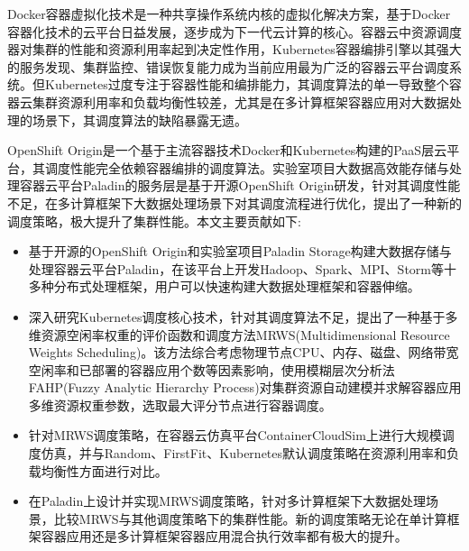 \begin{cabstract}
  Docker容器虚拟化技术是一种共享操作系统内核的虚拟化解决方案，基于Docker容器化技术的云平台日益发展，逐步成为下一代云计算的核心。容器云中资源调度器对集群的性能和资源利用率起到决定性作用，Kubernetes容器编排引擎以其强大的服务发现、集群监控、错误恢复能力成为当前应用最为广泛的容器云平台调度系统。但Kubernetes过度专注于容器性能和编排能力，其调度算法的单一导致整个容器云集群资源利用率和负载均衡性较差，尤其是在多计算框架容器应用对大数据处理的场景下，其调度算法的缺陷暴露无遗。

OpenShift Origin是一个基于主流容器技术Docker和Kubernetes构建的PaaS层云平台，其调度性能完全依赖容器编排的调度算法。实验室项目大数据高效能存储与处理容器云平台Paladin的服务层是基于开源OpenShift Origin研发，针对其调度性能不足，在多计算框架下大数据处理场景下对其调度流程进行优化，提出了一种新的调度策略，极大提升了集群性能。本文主要贡献如下:
  \begin{itemize}
  \item 基于开源的OpenShift Origin和实验室项目Paladin Storage构建大数据存储与处理容器云平台Paladin，在该平台上开发Hadoop、Spark、MPI、Storm等十多种分布式处理框架，用户可以快速构建大数据处理框架和容器伸缩。
  \item 深入研究Kubernetes调度核心技术，针对其调度算法不足，提出了一种基于多维资源空闲率权重的评价函数和调度方法MRWS(Multidimensional Resource Weights Scheduling)。该方法综合考虑物理节点CPU、内存、磁盘、网络带宽空闲率和已部署的容器应用个数等因素影响，使用模糊层次分析法FAHP(Fuzzy Analytic Hierarchy Process)对集群资源自动建模并求解容器应用多维资源权重参数，选取最大评分节点进行容器调度。
  \item 针对MRWS调度策略，在容器云仿真平台ContainerCloudSim上进行大规模调度仿真，并与Random、FirstFit、Kubernetes默认调度策略在资源利用率和负载均衡性方面进行对比。
  \item 在Paladin上设计并实现MRWS调度策略，针对多计算框架下大数据处理场景，比较MRWS与其他调度策略下的集群性能。新的调度策略无论在单计算框架容器应用还是多计算框架容器应用混合执行效率都有极大的提升。
  \end{itemize}
\end{cabstract}


